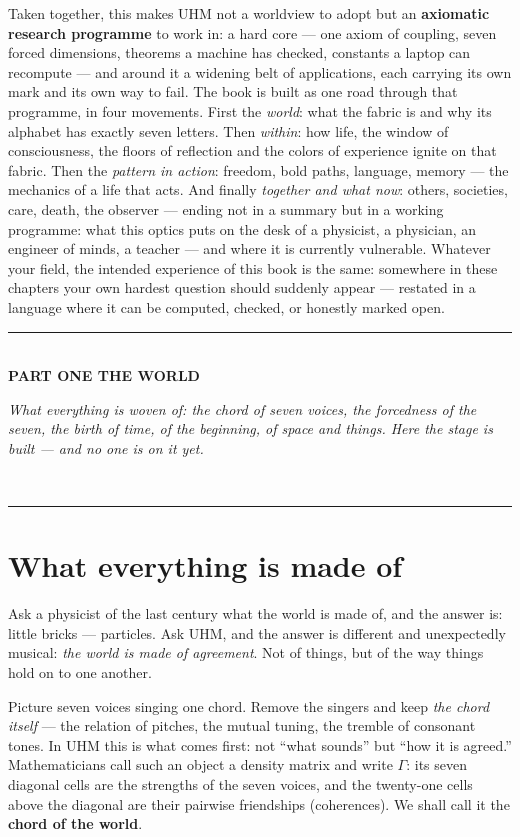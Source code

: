 \documentclass[11pt,letterpaper]{article}
\newcommand{\Gam}{\Gamma}
\newcommand{\partline}[2]{%
  \clearpage\vspace*{4pt}\begin{center}
  {\color{fact}\rule{0.55\textwidth}{0.4pt}}\\[9pt]
  {\large\bfseries #1}\\[7pt]
  \begin{minipage}{0.82\textwidth}\centering\small\itshape\color{plosgray} #2\end{minipage}\\[9pt]
  {\color{fact}\rule{0.55\textwidth}{0.4pt}}
  \end{center}\bigskip}
\begin{document}
Taken together, this makes UHM not a worldview to adopt but an
\textbf{axiomatic research programme} to work in: a hard core ---
one axiom of coupling, seven forced dimensions, theorems a machine
has checked, constants a laptop can recompute --- and around it a
widening belt of applications, each carrying its own mark and its
own way to fail. The book is built as one road through that
programme, in four movements. First the \emph{world}: what the
fabric is and why its alphabet has exactly seven letters. Then
\emph{within}: how life, the window of consciousness, the floors of
reflection and the colors of experience ignite on that fabric. Then
the \emph{pattern in action}: freedom, bold paths, language,
memory --- the mechanics of a life that acts. And finally
\emph{together and what now}: others, societies, care, death, the
observer --- ending not in a summary but in a working programme:
what this optics puts on the desk of a physicist, a physician, an
engineer of minds, a teacher --- and where it is currently
vulnerable. Whatever your field, the intended experience of this
book is the same: somewhere in these chapters your own hardest
question should suddenly appear --- restated in a language where it
can be computed, checked, or honestly marked open.

\partline{PART ONE \;\textperiodcentered\; THE WORLD}{What everything is woven of: the chord
of seven voices, the forcedness of the seven, the birth of time, of the beginning, of space and
things. Here the stage is built --- and no one is on it yet.}

\section{What everything is made of}
\label{sec:fabric}

Ask a physicist of the last century what the world is made of, and the
answer is: little bricks --- particles. Ask UHM, and the answer is
different and unexpectedly musical: \emph{the world is made of
agreement}. Not of things, but of the way things hold on to one
another.

Picture seven voices singing one chord. Remove the singers and keep
\emph{the chord itself} --- the relation of pitches, the mutual tuning,
the tremble of consonant tones. In UHM this is what comes first: not
``what sounds'' but ``how it is agreed.'' Mathematicians call such an
object a density matrix and write $\Gam$: its seven diagonal cells
are the strengths of the seven voices, and the twenty-one cells above
the diagonal are their pairwise friendships (coherences). We shall
call it the \textbf{chord of the world}.
\end{document}
